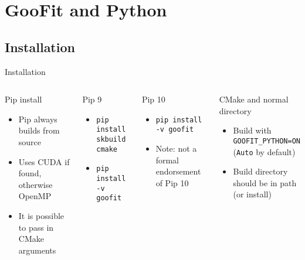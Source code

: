 \documentclass[aspectratio=169, smaller]{beamer}
\begin{document}
\section{GooFit and Python}
\subsection{Installation}
\begin{frame}{Installation}

    \begin{columns}[c]
        \begin{block}{Pip install}
            \begin{itemize}
                \item Pip always builds from source
                \item Uses CUDA if found, otherwise OpenMP
                \item It is possible to pass in CMake arguments
            \end{itemize}
        \end{block}

        \begin{block}{Pip 9}
            \begin{itemize}
                \item \texttt{pip install skbuild cmake}
                \item \texttt{pip install -v goofit}
            \end{itemize}
        \end{block}

        \begin{block}{Pip 10}
            \begin{itemize}
                \item \texttt{pip install -v goofit}
                \item Note: not a formal endorsement of Pip 10
            \end{itemize}
        \end{block}


        \begin{block}{CMake and normal directory}
            \begin{itemize}
                \item Build with \texttt{GOOFIT\_PYTHON=ON} (\texttt{Auto} by default)
                \item Build directory should be in path (or install)
            \end{itemize}
        \end{block}
    \end{columns}
\end{frame}
\end{document}
